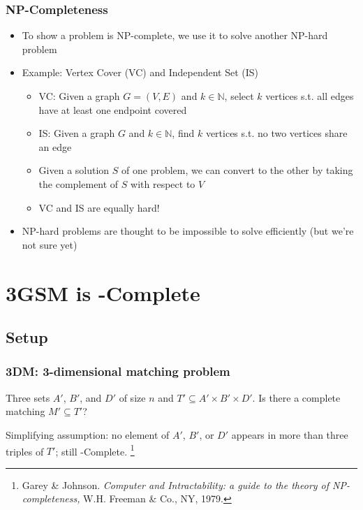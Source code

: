 \documentclass[mathserif,serif]{beamer}
\begin{document}
\begin{frame}
  \frametitle{NP-Completeness}
  \begin{itemize}
  \item To show a problem is  NP-complete, we use it to solve another NP-hard problem
  \item Example: Vertex Cover (VC) and Independent Set (IS)
    \begin{itemize}
    \item VC: Given a graph $G = (V, E)$ and $k \in \mathbb{N}$, select $k$ vertices s.t. all edges have at least one endpoint covered
    \item IS: Given a graph $G$ and $k \in \mathbb{N}$, find $k$ vertices s.t. no two vertices share an edge
    \item Given a solution $S$ of one problem, we can convert to the other by taking the complement of $S$ with respect to $V$
    \item VC and IS are equally hard!
    \end{itemize}
  \item NP-hard problems are thought to be impossible to solve efficiently (but we're not sure yet)
  \end{itemize}
\end{frame}



\section{3GSM is \NP-Complete}

\subsection{Setup}

\begin{frame}
	\frametitle{3DM: 3-dimensional matching problem}

	Three sets $A'$, $B'$, and $D'$ of size $n$ and $T' \subseteq A' \times B' \times D'$.  Is there a complete
	matching $M' \subseteq T'$?

	Simplifying assumption: no element of $A'$, $B'$, or $D'$ appears in more than three triples of $T'$; still
	\NP-Complete. \footnote{Garey \& Johnson. \textit{Computer and Intractability: a guide to the theory of NP-completeness,} W.H. Freeman \& Co., NY, 1979.}
\end{frame}
\end{document}
